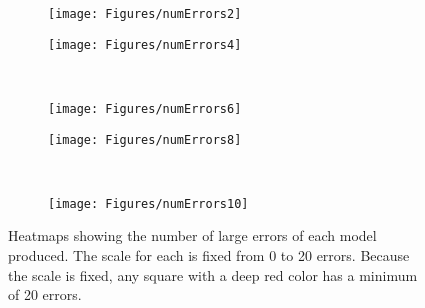 \begin{figure*}
  \begin{subfigure}{0.5\textwidth}
    \texttt{[image: Figures/numErrors2]}
    \caption{} 
    \label{numErrors2}
  \end{subfigure}%
  \hspace*{\fill}   %
  \begin{subfigure}{0.5\textwidth}
    \texttt{[image: Figures/numErrors4]}
    \caption{} 
    \label{numErrors4}
  \end{subfigure}%
    \\
  \begin{subfigure}{0.5\textwidth}
    \texttt{[image: Figures/numErrors6]}
    \caption{} 
    \label{numErrors6}
  \end{subfigure}%
    \hspace*{\fill}   %
  \begin{subfigure}{0.5\textwidth}
    \texttt{[image: Figures/numErrors8]}
    \caption{} 
    \label{numErrors8}
  \end{subfigure}%
    \\
  \begin{subfigure}{0.5\textwidth}
    \texttt{[image: Figures/numErrors10]}
    \caption{} 
    \label{numErrors10}
  \end{subfigure}%
\caption{Heatmaps showing the number of large errors of each model produced. The scale for each is fixed from 0 to 20 errors. Because the scale is fixed, any square with a deep red color has a minimum of 20 errors.}
\label{numErrorHeatmaps}
\end{figure*}


